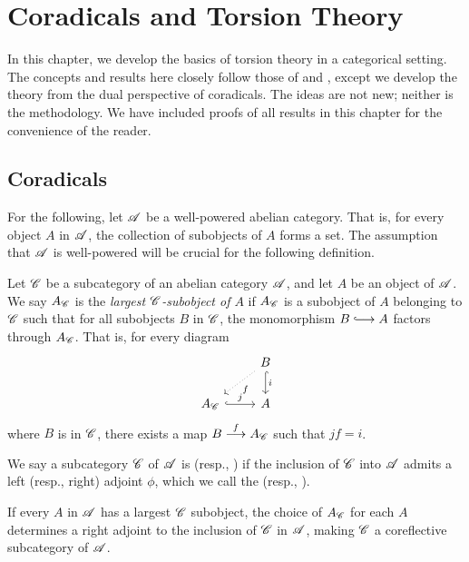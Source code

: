 \chapter{Coradicals and Torsion Theory}\label{sect_torsion_theory}

In this chapter, we develop the basics of torsion theory in a 
categorical setting. The concepts and results here closely follow
those of \cite{BJV} and \cite{DTor}, except we develop the theory
from the dual perspective of coradicals. The ideas are not new;
neither is the methodology. We have included proofs of all results 
in this chapter for the convenience of the reader.

\section{Coradicals}
\label{sect_coradicals}

For the following, let $\mathscr{A}$ be a well-powered abelian category.
That is, for every object $A$ in $\mathscr{A}$, the collection of 
subobjects of $A$ forms a set. The assumption that $\mathscr{A}$ is
well-powered will be crucial for the following definition. 

\begin{defn}
Let $\mathscr{C}$ be a subcategory of an abelian category $\mathscr{A}$, 
and let $A$ be an object of $\mathscr{A}$. We say $A_{\mathscr{C}}$ is the 
\emph{largest $\mathscr{C}$-subobject of $A$} if $A_{\mathscr{C}}$ is a 
subobject of $A$ belonging to $\mathscr{C}$ such that for all 
subobjects $B$ in $\mathscr{C}$, the monomorphism $B \into A$ factors
through $A_{\mathscr{C}}$. That is, for every diagram
\[
\begin{tikzcd}
{} &
B \arrow[hook]{d}{i} \arrow[dotted]{ld}{f} \\
A_{\Cat{C}} \arrow[hook]{r}{j} & A
\end{tikzcd}
\]
where $B$ is in $\mathscr{C}$, there exists a map $B \stackrel{f}{\longrightarrow} 
A_{\mathscr{C}}$ such that $jf = i$.

We say a subcategory $\mathscr{C}$ of $\mathscr{A}$ is 
(resp., ) if the inclusion of $\mathscr{C}$ into
$\mathscr{A}$ admits a left (resp., right) adjoint $\phi$, which we
call the  (resp., ).

If every $A$ in $\mathscr{A}$ has a largest $\mathscr{C}$ subobject, the 
choice of $A_{\mathscr{C}}$ for each $A$ determines a right adjoint to 
the inclusion of $\mathscr{C}$ in $\mathscr{A}$, making $\mathscr{C}$ a 
coreflective subcategory of $\mathscr{A}$. 
\end{defn}

